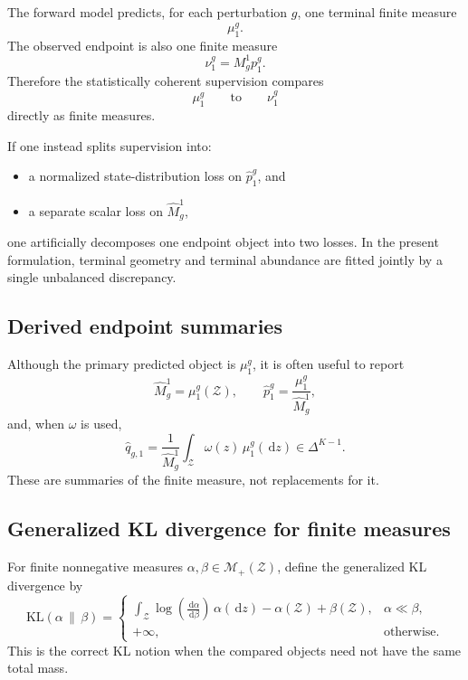 \documentclass[11pt]{article}
\newcommand{\dd}{\,\mathrm{d}}
\newcommand{\KL}{\mathrm{KL}}
\newcommand{\Zcal}{\mathcal{Z}}
\newcommand{\simplex}{\Delta}
\newcommand{\Mplus}{\mathcal{M}_{+}}
\begin{document}
The forward model predicts, for each perturbation $g$, one terminal finite measure
\[
\mu_1^g.
\]
The observed endpoint is also one finite measure
\[
\nu_1^g = M_g^1 p_1^g.
\]
Therefore the statistically coherent supervision compares
\[
\mu_1^g
\qquad \text{to} \qquad
\nu_1^g
\]
directly as finite measures.

If one instead splits supervision into:
\begin{itemize}[leftmargin=2em]
    \item a normalized state-distribution loss on $\hat p_1^g$, and
    \item a separate scalar loss on $\hat M_g^1$,
\end{itemize}
one artificially decomposes one endpoint object into two losses. In the present formulation, terminal geometry and terminal abundance are fitted jointly by a single unbalanced discrepancy.

\subsection{Derived endpoint summaries}

Although the primary predicted object is $\mu_1^g$, it is often useful to report
\begin{equation}
\hat M_g^1 = \mu_1^g(\Zcal),
\qquad
\hat p_1^g = \frac{\mu_1^g}{\hat M_g^1},
\label{eq:pred_terminal_prob}
\end{equation}
and, when $\omega$ is used,
\begin{equation}
\hat q_{g,1}
=
\frac{1}{\hat M_g^1}
\int_{\Zcal}\omega(z)\,\mu_1^g(\dd z)
\in \simplex^{K-1}.
\label{eq:pred_terminal_comp}
\end{equation}
These are summaries of the finite measure, not replacements for it.

\subsection{Generalized KL divergence for finite measures}

For finite nonnegative measures $\alpha,\beta\in\Mplus(\Zcal)$, define the generalized KL divergence by
\begin{equation}
\KL(\alpha \,\|\, \beta)
=
\begin{cases}
\displaystyle
\int_{\Zcal}
\log\!\left(\frac{\dd\alpha}{\dd\beta}\right)\,\alpha(\dd z)
-
\alpha(\Zcal)
+
\beta(\Zcal),
& \alpha \ll \beta, \\[1.5ex]
+\infty, & \text{otherwise.}
\end{cases}
\label{eq:gkl}
\end{equation}
This is the correct KL notion when the compared objects need not have the same total mass.
\end{document}
